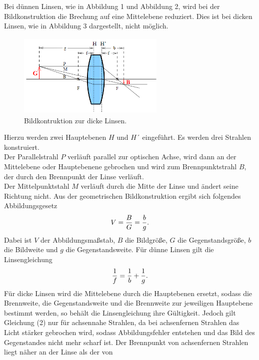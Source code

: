    \noindent
Bei dünnen Linsen, wie in Abbildung 1 und Abbildung 2, wird bei der Bildkonstruktion
die Brechung auf eine Mittelebene reduziert. Dies ist bei dicken Linsen, wie in Abbildung
3 dargestellt, nicht möglich.
\begin{figure}[H]
   \begin{center}
   \includegraphics[width = 7cm, height= 4cm]{dicke Linsen.png}
   \caption{Bildkontruktion zur dicke Linsen.\protect\cite{AL}}
   \end{center}
   \label{fig:dicke Linsen}
   \end{figure}
   \noindent
Hierzu werden zwei Hauptebenen $H$ und $H´$
eingeführt. Es werden drei Strahlen konstruiert.\\
Der Parallelstrahl $P$ verläuft parallel zur optischen Achse, wird dann an der Mittelebene
oder Hauptebenene gebrochen und wird zum Brennpunktstrahl $B$, der durch den Brennpunkt der Linse verläuft.\\
Der Mittelpunktstahl $M$ verläuft durch die Mitte der Linse und ändert seine Richtung
nicht. Aus der geometrischen Bildkonstruktion ergibt sich folgendes Abbildungsgesetz
\begin{equation}
    V=\frac{B}{G}= \frac{b}{g}.\\
   \end{equation}
\noindent
 Dabei ist $V$ der Abbildungsmaßstab, $B$ die Bildgröße, $G$ die Gegenstandsgröße, $b$ die
   Bildweite und $g$ die Gegenstandsweite. Für dünne Linsen gilt die Linsengleichung  
   \begin{equation}
    \frac{1}{f}=\frac{1}{b}+ \frac{1}{g}.\\
   \end{equation}
\noindent
Für dicke Linsen wird die Mittelebene durch die Hauptebenen ersetzt, sodass die Brennweite, die Gegenstandsweite und die Brennweite zur jeweiligen Hauptebene bestimmt
werden, so behält die Linsengleichung ihre Gültigkeit. Jedoch gilt Gleichung (2) nur für
achsennahe Strahlen, da bei achsenfernen Strahlen das Licht stärker gebrochen wird,
sodass Abbildungsfehler entstehen und das Bild des Gegenstandes nicht mehr scharf
ist. Der Brennpunkt von achsenfernen Strahlen liegt näher an der Linse als der von
